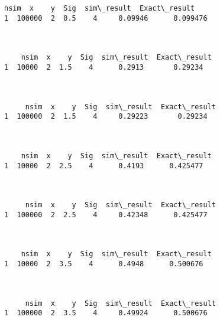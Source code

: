 \documentclass[12pt]{article}
\begin{document}
\begin{Verbatim}[commandchars=\\\{\}]
     nsim  x    y  Sig  sim\_result  Exact\_result
1  100000  2  0.5    4     0.09946      0.099476



    nsim  x    y  Sig  sim\_result  Exact\_result
1  10000  2  1.5    4      0.2913       0.29234



     nsim  x    y  Sig  sim\_result  Exact\_result
1  100000  2  1.5    4     0.29223       0.29234



    nsim  x    y  Sig  sim\_result  Exact\_result
1  10000  2  2.5    4      0.4193      0.425477



     nsim  x    y  Sig  sim\_result  Exact\_result
1  100000  2  2.5    4     0.42348      0.425477



    nsim  x    y  Sig  sim\_result  Exact\_result
1  10000  2  3.5    4      0.4948      0.500676



     nsim  x    y  Sig  sim\_result  Exact\_result
1  100000  2  3.5    4     0.49924      0.500676



    \end{Verbatim}


    
    
    
\end{document}
